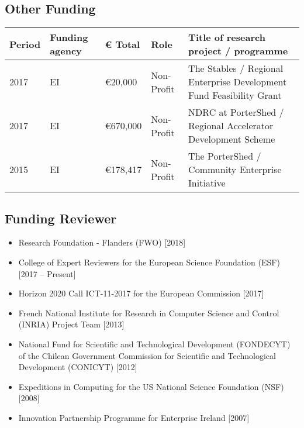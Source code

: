 \documentclass[10pt,a4paper]{res} %
\begin{document}
\begin{resume}
\subsection*{Other Funding}

\begin{tabular}{ p{2 cm} | p{2 cm} | p{2 cm} | p{2 cm} | p{7 cm} }
Period & Funding agency & \euro{} Total & Role & Title of research project / programme \\
\hline
2017 & EI & \euro{}20,000 & Non-Profit & The Stables / Regional Enterprise Development Fund Feasibility Grant \\
2017 & EI & \euro{}670,000 & Non-Profit & NDRC at PorterShed / Regional Accelerator Development Scheme \\
2015 & EI & \euro{}178,417 & Non-Profit & The PorterShed / Community Enterprise Initiative \\
\end{tabular}

\subsection*{Funding Reviewer}

\begin{itemize} \itemsep -2pt
\item Research Foundation - Flanders (FWO) [2018]
\item College of Expert Reviewers for the European Science Foundation (ESF) [2017 -- Present]
\item Horizon 2020 Call ICT-11-2017 for the European Commission [2017]
\item French National Institute for Research in Computer Science and Control (INRIA) Project Team [2013]
\item National Fund for Scientific and Technological Development (FONDECYT) of the Chilean Government Commission for Scientific and Technological Development (CONICYT) [2012]
\item Expeditions in Computing for the US National Science Foundation (NSF) [2008]
\item Innovation Partnership Programme for Enterprise Ireland [2007]
\end{itemize}


\vspace{0.2in} %



\end{resume}
\end{document}

